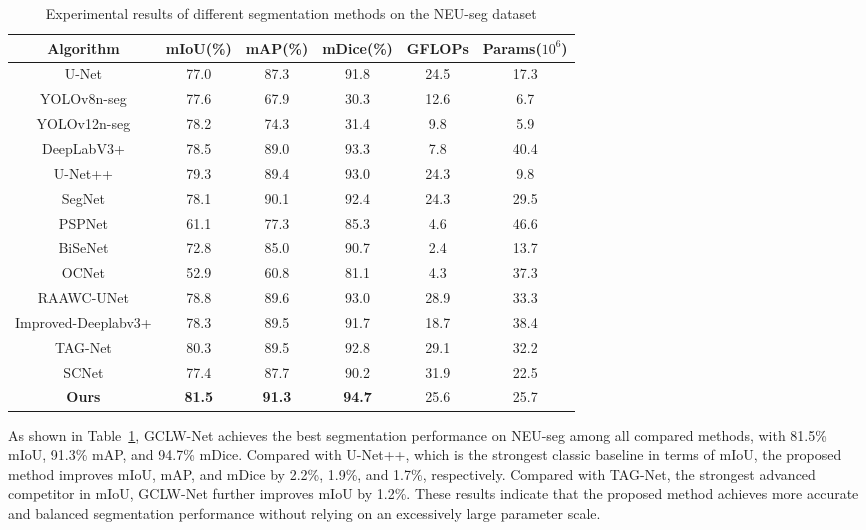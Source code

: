 \documentclass[sn-basic]{sn-jnl}
\theoremstyle{thmstyleone}%
\theoremstyle{thmstyletwo}%
\theoremstyle{thmstylethree}%
\begin{document}
\begin{table}[htbp]
\caption{Experimental results of different segmentation methods on the NEU-seg dataset}
\label{tab:neuseg_comparison}
\centering
\begin{tabular}{cccccc}
\toprule
Algorithm & mIoU(\%) & mAP(\%) & mDice(\%) & GFLOPs & Params($10^6$) \\
\midrule
U-Net \cite{Jiao2020Refined}& 77.0 & 87.3 & 91.8 & 24.5 & 17.3 \\
YOLOv8n-seg \cite{Varghese2024YOLOv8}& 77.6 & 67.9 & 30.3 & 12.6 & 6.7 \\
YOLOv12n-seg \cite{Tian2025YOLOv12}& 78.2 & 74.3 & 31.4 & 9.8 & 5.9 \\
DeepLabV3+ \cite{Chen2018Encoder}& 78.5 & 89.0 & 93.3 & 7.8 & 40.4 \\
U-Net++ \cite{Zhou2018UNet}& 79.3 & 89.4 & 93.0 & 24.3 & 9.8 \\
SegNet\cite{Badrinarayanan2017SegNet} & 78.1 & 90.1 & 92.4 & 24.3 & 29.5 \\
PSPNet \cite{Zhao2017Pyramid}& 61.1 & 77.3 & 85.3 & 4.6 & 46.6 \\
BiSeNet\cite{Yu2018BiSeNet} & 72.8 & 85.0 & 90.7 & 2.4 & 13.7 \\
OCNet \cite{Yuan2018OCNet}& 52.9 & 60.8 & 81.1 & 4.3 & 37.3 \\
RAAWC-UNet\cite{Wang2024RAAWC} & 78.8 & 89.6 & 93.0 & 28.9 & 33.3 \\
Improved-Deeplabv3+\cite{Guclu2024Improved} & 78.3 & 89.5 & 91.7 & 18.7 & 38.4 \\
TAG-Net\cite{Jeong2025TAG} & 80.3 & 89.5 & 92.8 & 29.1 & 32.2 \\
SCNet\cite{Lin2025SCNet} & 77.4 & 87.7 & 90.2 & 31.9 & 22.5 \\
\midrule
\textbf{Ours} & \textbf{81.5} & \textbf{91.3} & \textbf{94.7} & 25.6 & 25.7 \\
\bottomrule
\end{tabular}
\end{table}

As shown in Table~\ref{tab:neuseg_comparison}, GCLW-Net achieves the best segmentation performance on NEU-seg among all compared methods, with 81.5\% mIoU, 91.3\% mAP, and 94.7\% mDice. Compared with U-Net++, which is the strongest classic baseline in terms of mIoU, the proposed method improves mIoU, mAP, and mDice by 2.2\%, 1.9\%, and 1.7\%, respectively. Compared with TAG-Net, the strongest advanced competitor in mIoU, GCLW-Net further improves mIoU by 1.2\%. These results indicate that the proposed method achieves more accurate and balanced segmentation performance without relying on an excessively large parameter scale.
\end{document}

